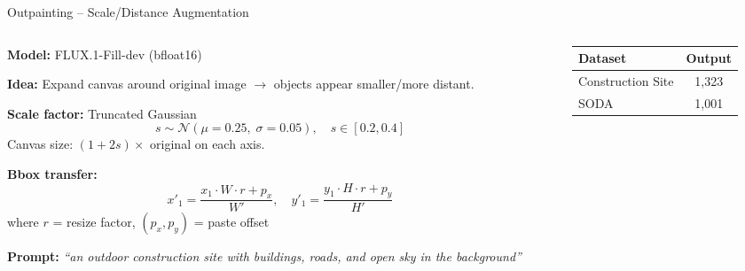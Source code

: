 \documentclass[aspectratio=169, 10pt]{beamer}
\begin{document}

\begin{frame}{Outpainting -- Scale/Distance Augmentation}
\begin{columns}[T]
\begin{column}{0.52\textwidth}
\textbf{Model:} FLUX.1-Fill-dev (bfloat16)

\vspace{0.3em}
\textbf{Idea:} Expand canvas around original image $\rightarrow$ objects appear smaller/more distant.

\vspace{0.3em}
\textbf{Scale factor:} Truncated Gaussian
\[
s \sim \mathcal{N}(\mu{=}0.25,\;\sigma{=}0.05), \quad s \in [0.2, 0.4]
\]
\vspace{-0.5em}
Canvas size: $(1+2s) \times$ original on each axis.

\vspace{0.3em}
\textbf{Bbox transfer:}
\[
x'_1 = \frac{x_1 \cdot W \cdot r + p_x}{W'}, \quad
y'_1 = \frac{y_1 \cdot H \cdot r + p_y}{H'}
\]
\vspace{-0.5em}
{\scriptsize where $r$ = resize factor, $(p_x, p_y)$ = paste offset}

\vspace{0.3em}
\textbf{Prompt:} \textit{``an outdoor construction site with buildings, roads, and open sky in the background''}
\end{column}
\begin{column}{0.45\textwidth}
\centering
{}

\vspace{0.5em}
\begin{tabular}{lc}
\toprule
\textbf{Dataset} & \textbf{Output} \\
\midrule
Construction Site & 1,323 \\
SODA & 1,001 \\
\bottomrule
\end{tabular}
\end{column}
\end{columns}
\end{frame}
\end{document}
